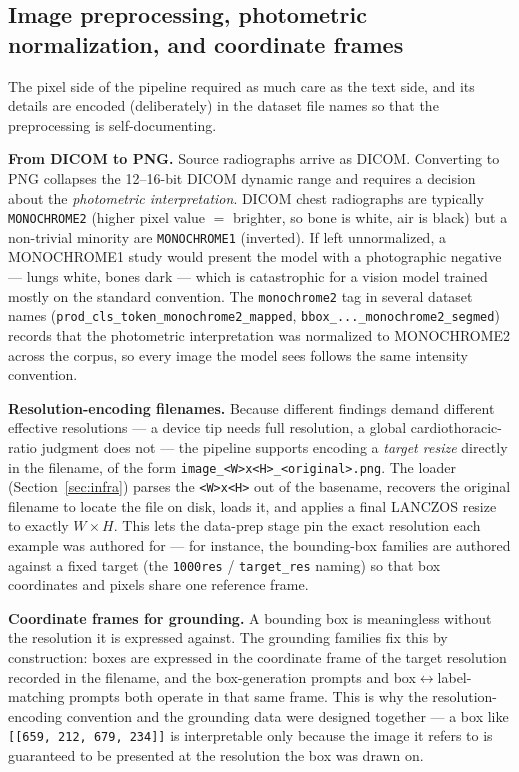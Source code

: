 \documentclass[11pt,a4paper]{article}
\begin{document}
\subsection{Image preprocessing, photometric normalization, and coordinate frames}
\label{sec:preproc}
The pixel side of the pipeline required as much care as the text side, and its details are encoded (deliberately) in the dataset file names so that the preprocessing is self-documenting.

\textbf{From DICOM to PNG.} Source radiographs arrive as DICOM. Converting to PNG collapses the 12--16-bit DICOM dynamic range and requires a decision about the \emph{photometric interpretation}. DICOM chest radiographs are typically \texttt{MONOCHROME2} (higher pixel value $=$ brighter, so bone is white, air is black) but a non-trivial minority are \texttt{MONOCHROME1} (inverted). If left unnormalized, a MONOCHROME1 study would present the model with a photographic negative --- lungs white, bones dark --- which is catastrophic for a vision model trained mostly on the standard convention. The \texttt{monochrome2} tag in several dataset names (\texttt{prod\_cls\_token\_monochrome2\_mapped}, \texttt{bbox\_...\_monochrome2\_segmed}) records that the photometric interpretation was normalized to MONOCHROME2 across the corpus, so every image the model sees follows the same intensity convention.

\textbf{Resolution-encoding filenames.} Because different findings demand different effective resolutions --- a device tip needs full resolution, a global cardiothoracic-ratio judgment does not --- the pipeline supports encoding a \emph{target resize} directly in the filename, of the form \texttt{image\_<W>x<H>\_<original>.png}. The loader (Section~\ref{sec:infra}) parses the \texttt{<W>x<H>} out of the basename, recovers the original filename to locate the file on disk, loads it, and applies a final LANCZOS resize to exactly $W\times H$. This lets the data-prep stage pin the exact resolution each example was authored for --- for instance, the bounding-box families are authored against a fixed target (the \texttt{1000res} / \texttt{target\_res} naming) so that box coordinates and pixels share one reference frame.

\textbf{Coordinate frames for grounding.} A bounding box is meaningless without the resolution it is expressed against. The grounding families fix this by construction: boxes are expressed in the coordinate frame of the target resolution recorded in the filename, and the box-generation prompts and box$\leftrightarrow$label-matching prompts both operate in that same frame. This is why the resolution-encoding convention and the grounding data were designed together --- a box like \texttt{[[659, 212, 679, 234]]} is interpretable only because the image it refers to is guaranteed to be presented at the resolution the box was drawn on.
\end{document}
